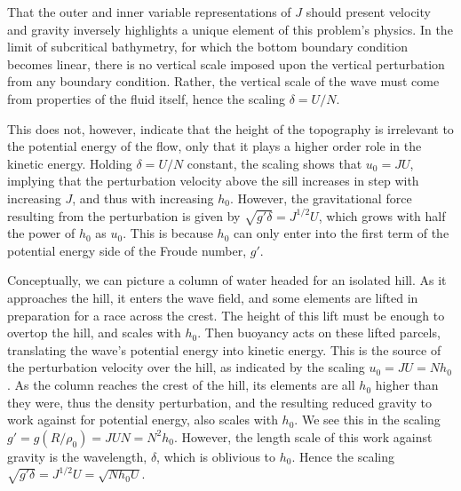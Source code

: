 \documentclass[12pt]{article}
\begin{document}
		That the outer and inner variable representations of $J$ should present velocity and gravity inversely highlights a unique element of this problem's physics. In the limit of subcritical bathymetry, for which the bottom boundary condition becomes linear,  there is no vertical scale imposed upon the vertical perturbation from any boundary condition. Rather, the vertical scale of the wave must come from properties of the fluid itself, hence the scaling $\delta = U/N$. 
	
	This does not, however, indicate that the height of the topography is irrelevant to the potential energy of the flow, only that it plays a higher order role in the kinetic energy. Holding $\delta=U/N$ constant, the scaling shows that $u_0 = J U$, implying that the perturbation velocity above the sill increases in step with increasing $J$, and thus with increasing $h_0$. However, the gravitational force resulting from the perturbation is given by $\sqrt{g'\delta} = J^{1/2} U$, which grows with half the power of $h_0$ as $u_0$. This is because $h_0$ can only enter into the first term of the potential energy side of the Froude number, $g'$. 
	
	Conceptually, we can picture a column of water headed for an isolated hill. As it approaches the hill, it enters the wave field, and some elements are lifted in preparation for a race across the crest. The height of this lift must be enough to overtop the hill, and scales with $h_0$. Then buoyancy acts on these lifted parcels, translating the wave's potential energy into kinetic energy. This is the source of the perturbation velocity over the hill, as indicated by the scaling $u_0=JU=Nh_0$.  As the column reaches the crest of the hill, its elements are all $h_0$ higher than they were, thus the density perturbation, and the resulting reduced gravity to work against for potential energy, also scales with $h_0$. We see this in the scaling $g'=g (R/\rho_0)=JUN=N^2h_0$. However, the length scale of this work against gravity is the wavelength, $\delta$, which is oblivious to $h_0$. Hence the scaling $\sqrt{g'\delta} = J^{1/2} U = \sqrt{Nh_0U}$. 
	
\end{document}
